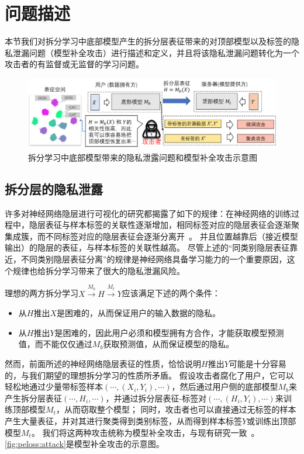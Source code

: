 \section{问题描述}
本节我们对拆分学习中底部模型产生的拆分层表征带来的对顶部模型以及标签的隐私泄漏问题（模型补全攻击）进行描述和定义，并且将该隐私泄漏问题转化为一个攻击者的有监督或无监督的学习问题。

\begin{figure}[h!]
    \centering
    \includegraphics[width=1\linewidth]{Z_Resources/peloss_attack.png}
    \caption{拆分学习中底部模型带来的隐私泄露问题和模型补全攻击示意图}
    \label{fig:peloss:attack}
\end{figure}

\subsection{拆分层的隐私泄露}
许多对神经网络隐层进行可视化的研究都揭露了如下的规律：在神经网络的训练过程中，隐层表征与样本标签的关联性逐渐增加，相同标签对应的隐层表征会逐渐聚集成簇，而不同标签对应的隐层表征会逐渐分离开~\cite{paulo2017visualize_hidden,pezzotti2017deepeyes,cantareira2020hidden_vector_fields}。
%
并且位置越靠后（接近模型输出）的隐层的表征，与样本标签的关联性越高。
%
尽管上述的“同类别隐层表征靠近，不同类别隐层表征分离”的规律是神经网络具备学习能力的一个重要原因，这个规律也给拆分学习带来了很大的隐私泄漏风险。
%

理想的两方拆分学习$X \stackrel{M_b}{\to} H \stackrel{M_t}{\to} Y$应该满足下述的两个条件：
\begin{itemize}
    \item 从$H$推出$X$是困难的，从而保证用户的输入数据的隐私。
    \item 从$H$推出$Y$是困难的，因此用户必须和模型拥有方合作，才能获取模型预测值，而不能仅仅通过$M_b$获取预测值，从而保证模型的隐私。
\end{itemize}
然而，前面所述的神经网络隐层表征的性质，恰恰说明$H$推出$Y$可能是十分容易的，与我们期望的理想拆分学习的性质所矛盾。
%
假设攻击者腐化了用户，它可以轻松地通过少量带标签样本$(\cdots, (X_i, Y_i), \cdots)$，然后通过用户侧的底部模型$M_b$来产生拆分层表征$(\cdots, H_i, \cdots)$，并通过拆分层表征-标签对$(\cdots, (H_i, Y_i), \cdots)$来训练顶部模型$M_t$，从而窃取整个模型；
同时，攻击者也可以直接通过无标签的样本产生大量表征，并对其进行聚类得到类别标签，从而得到样本标签$Y$或训练出顶部模型$M_t$。
%
我们将这两种攻击统称为模型补全攻击，与现有研究一致~\cite{fucong2022label_infer_attack,liu2024vertical}。
%
\autoref{fig:peloss:attack}是模型补全攻击的示意图。



